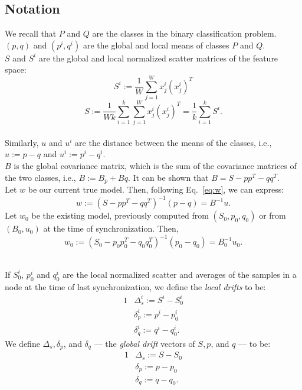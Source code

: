 \documentclass{vldb}
\begin{document}
\subsection{Notation}
\noindent
We recall that $P$ and $Q$ are the classes in the binary classification problem.
 $(p,q)$ and $(p^i,q^i)$  are the global and local means of classes $P$ and $Q$.
\\$S$ and $S^i$  are the global and local normalized scatter matrices of the feature space:
\begin{equation*}
S^i := \frac{1}{W}\sum_{j=1}^{W}x^i_j(x^i_j)^T
\end{equation*}
\begin{equation*}
S := \frac{1}{Wk}
\sum_{i=1}^k\sum_{j=1}^Wx^i_j(x^i_j)^T=\frac{1}{k}\sum_{i=1}^kS^i.
\end{equation*}
\\Similarly, $u$ and $u^i$ are the distance between the means of the classes, i.e., $u:=p - q$ and $u^i:=p^i - q^i$.
\\ $B$ is the global covariance matrix, which is the sum of the covariance matrices of the two classes, i.e., $B:=B_p+Bq$.
It can be shown that $B=S - pp^T - qq^T$.
\\Let $w$ be our current true model. Then, following Eq.~\ref{eq:w}, we can express:
\begin{equation}
w:=(S - pp^T - qq^T)^{-1}(p-q)=B^{-1}u.
\end{equation}
Let $w_0$ be the existing model, previously computed from $(S_0, p_0, q_0)$
or from $(B_0,u_0)$ at the time of synchronization.
Then,
\begin{equation}
w_0:=(S_0 - p_0p_0^T - q_0q_0^T)^{-1}(p_0-q_0)=B_0^{-1}u_0.
\end{equation}

\\If $S_0^i$, $p_0^i$ and $q_0^i$ are the local normalized scatter and averages
of the samples in a node at the time of last synchronization, we define the \textit{local drifts} to be:
\begin{alignat*}{1}
& \Delta_s^i:= S^i - S_0^i
\\ & \delta_p^i:= p^i - p_0^i
\\ & \delta_q^i:= q^i - q_0^i.
\end{alignat*}
We define $\Delta_s, \delta_p$, and $\delta_q$ --- the \textit{global drift} vectors of $S, p$, and $q$ --- to be:
\begin{alignat*}{1}
& \Delta_s:= S - S_0 \\
& \delta_p:= p - p_0 \\
& \delta_q := q - q_0.
\end{alignat*}
\end{document}

